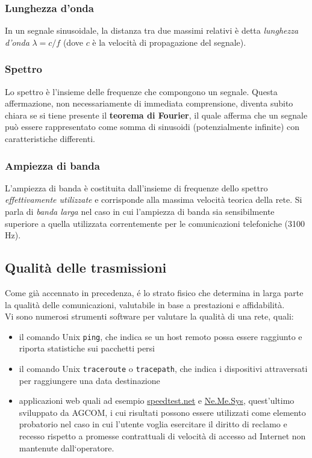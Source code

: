 \documentclass[a4paper,11pt]{article}
\def\code#1{\texttt{#1}}
\def\subsub#1{\subsubsection{#1}\label{#1}}
\begin{document}
\subsubsection{Lunghezza d'onda}
In un segnale sinusoidale, la distanza tra due massimi relativi è detta \textit{lunghezza d'onda} $\lambda =c/f$ (dove $c$ è la velocità di propagazione del segnale).

\subsub{Spettro}
Lo spettro è l'insieme delle frequenze che compongono un segnale. Questa affermazione, non necessariamente di immediata comprensione, diventa subito chiara se si tiene presente il \textbf{teorema di Fourier}, il quale afferma che un segnale può essere rappresentato come somma di sinusoidi (potenzialmente infinite) con caratteristiche differenti.

\subsub{Ampiezza di banda}
L'ampiezza di banda è costituita dall'insieme di frequenze dello spettro \textit{effettivamente utilizzate} e corrisponde alla massima velocità teorica della rete. Si parla di \textit{banda larga} nel caso in cui l'ampiezza di banda sia sensibilmente superiore a quella utilizzata correntemente per le comunicazioni telefoniche (3100 Hz).

\subsection{Qualità delle trasmissioni}
Come già accennato in precedenza, é lo strato fisico che determina in larga parte la qualità delle comunicazioni, valutabile in base a prestazioni e affidabilità. 
\\Vi sono numerosi strumenti software per valutare la qualità di una rete, quali:
\begin{itemize}
\item il comando Unix \code{ping}, che indica se un host remoto possa essere raggiunto e riporta statistiche sui pacchetti persi
\item il comando Unix \code{traceroute} o \code{tracepath}, che indica i dispositivi attraversati per raggiungere una data destinazione
\item applicazioni web quali ad esempio \url{speedtest.net} e \href{<https://www.misurainternet.it/>}{Ne.Me.Sys}, quest'ultimo sviluppato da AGCOM, i cui risultati possono essere utilizzati come elemento probatorio nel caso in cui l’utente voglia esercitare il diritto di reclamo e recesso rispetto a promesse contrattuali di velocità di accesso ad Internet non mantenute dall‘operatore.
\end{itemize}
\end{document}
